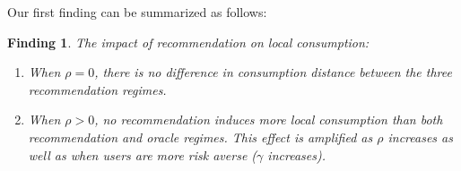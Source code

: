 \documentclass[sigconf]{acmart}
\newtheorem{finding}{Finding}
\begin{document}
Our first finding can be summarized as follows:

\begin{finding}\label{finding_local_consumption}
The impact of recommendation on local consumption:
\begin{enumerate}
\item When $\rho = 0$, there is no difference in consumption distance between the three recommendation regimes.
\item When $\rho > 0$, no recommendation induces more local consumption than both recommendation and oracle regimes. This effect is amplified as $\rho$ increases as well as when users are more risk averse ($\gamma$ increases).
\end{enumerate}
\end{finding}


\end{document}

